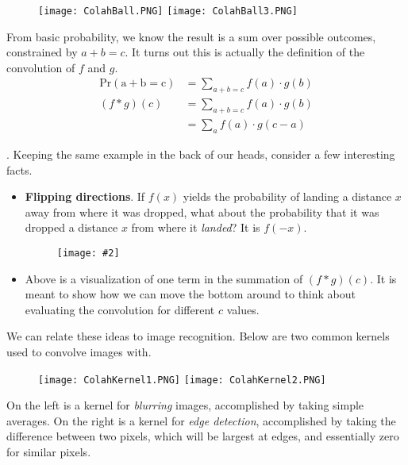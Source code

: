 \documentclass[11pt]{article}
\newcommand\myfig[2][0.3\textwidth]{\begin{figure}[h!]\centering\texttt{[image: \#2]}\end{figure}}
\newcommand\myspace[1][]{\vspace{#1\bigskipamount}}
\newcommand\p{\Needspace{10\baselineskip} \noindent}
\begin{document}
\begin{figure}[h!]
	\centering
	\texttt{[image: ColahBall.PNG]}
	\hspace{2cm}
	\texttt{[image: ColahBall3.PNG]}
\end{figure}

From basic probability, we know the result is a sum over possible outcomes, constrained by $a + b = c$. It turns out this is actually the definition of the convolution of $f$ and $g$. 
\begin{align}
\mathrm{Pr(a + b = c)} &= \sum_{a + b = c} f(a) \cdot g(b) \\
(f * g)(c) &= \sum_{a + b = c} f(a) \cdot g(b)\\
&= \sum_a f(a) \cdot g(c - a)
\end{align}

\myspace
\p {}. Keeping the same example in the back of our heads, consider a few interesting facts. 
\begin{itemize}
	\item \textbf{Flipping directions}. If $f(x)$ yields the probability of landing a distance $x$ away from where it was dropped, what about the probability that it was dropped a distance $x$ from where it \textit{landed}? It is $f(-x)$. 
	
	\myfig[0.3\textwidth]{ColahBall2.PNG}
	
	\item Above is a visualization of one term in the summation of $(f * g)(c)$. It is meant to show how we can move the bottom around to think about evaluating the convolution for different $c$ values. 
\end{itemize}
We can relate these ideas to image recognition. Below are two common kernels used to convolve images with. 
\begin{figure}[h!]
	\centering
	\texttt{[image: ColahKernel1.PNG]}
	\hspace{2.5cm}
	\texttt{[image: ColahKernel2.PNG]}
\end{figure}

On the left is a kernel for \textit{blurring} images, accomplished by taking simple averages. On the right is a kernel for \textit{edge detection}, accomplished by taking the difference between two pixels, which will be largest at edges, and essentially zero for similar pixels.


\end{document}
